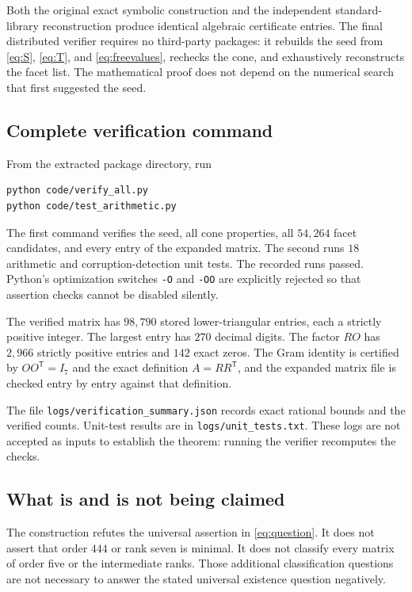 \documentclass[11pt]{article}
\theoremstyle{definition}
\newcommand{\trans}{^{\mathsf T}}
\numberwithin{equation}{section}
\begin{document}
Both the original exact symbolic construction and the independent
standard-library reconstruction produce identical algebraic certificate
entries. The final distributed verifier requires no third-party packages:
it rebuilds the seed from \eqref{eq:S}, \eqref{eq:T}, and
\eqref{eq:freevalues}, rechecks the cone, and exhaustively reconstructs the
facet list. The mathematical proof does not depend on the numerical search
that first suggested the seed.

\subsection{Complete verification command}
From the extracted package directory, run
\begin{Verbatim}[fontsize=\small]
python code/verify_all.py
python code/test_arithmetic.py
\end{Verbatim}
The first command verifies the seed, all cone properties, all $54,264$
facet candidates, and every entry of the expanded matrix. The second runs
$18$ arithmetic and corruption-detection unit tests. The recorded runs
passed. Python's optimization switches \texttt{-O} and \texttt{-OO} are
explicitly rejected so that assertion checks cannot be disabled silently.

The verified matrix has $98,790$ stored lower-triangular entries, each a
strictly positive integer. The largest entry has $270$ decimal digits.
The factor $RO$ has $2,966$ strictly positive entries and $142$ exact zeros.
The Gram identity is certified by $OO\trans=I_7$ and the exact definition
$A=RR\trans$, and the expanded matrix file is checked entry by entry
against that definition.

The file \texttt{logs/verification\_summary.json} records exact rational
bounds and the verified counts. Unit-test results are in
\texttt{logs/unit\_tests.txt}. These logs are not accepted as inputs to
establish the theorem: running the verifier recomputes the checks.

\subsection{What is and is not being claimed}
The construction refutes the universal assertion in
\eqref{eq:question}. It does not assert that order $444$ or rank seven is
minimal. It does not classify every matrix of order five or the intermediate
ranks. Those additional classification questions are not necessary to
answer the stated universal existence question negatively.
\end{document}

